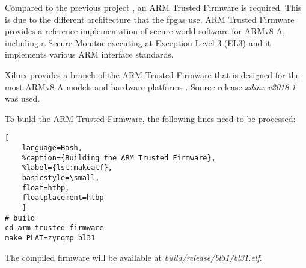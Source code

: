 Compared to the previous project \cite{oldrepo}, an ARM Trusted Firmware is required. This is due to the different architecture that the \glspl{fpga} use. ARM Trusted Firmware provides a reference implementation of secure world software for ARMv8-A, including a Secure Monitor executing at Exception Level 3 (EL3) and it implements various ARM interface standards.

Xilinx provides a branch of the ARM Trusted Firmware that is designed for the most ARMv8-A models and hardware platforms \cite{atf}. Source release \emph{xilinx-v2018.1} was used.

To build the ARM Trusted Firmware, the following lines need to be processed:
\begin{lstlisting}[
	language=Bash,
	%caption={Building the ARM Trusted Firmware},
	%label={lst:makeatf},
	basicstyle=\small,
	float=htbp,
	floatplacement=htbp
	]
# build
cd arm-trusted-firmware
make PLAT=zynqmp bl31
\end{lstlisting}
\FloatBarrier

The compiled firmware will be available at \emph{build/release/bl31/bl31.elf}.